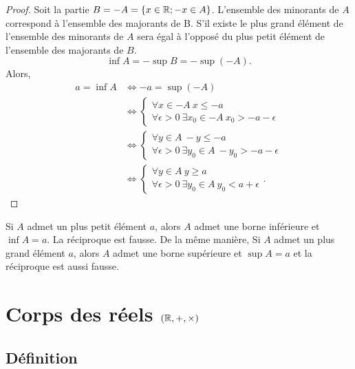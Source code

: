 \begin{proof}
  Soit la partie \(B = -A = \{x\in\mathbb{R}; -x\in A\}\). L'ensemble des minorants de 
  \(A\) correspond à l'ensemble des majorants de B. S'il existe le plus grand 
  élément de l'ensemble des minorants de \(A\) sera égal à l'opposé du plus 
  petit élément de l'ensemble des majorants de \(B\).
  \begin{equation}
    \inf A = -\sup B = -\sup( - A).
  \end{equation}
  Alors,
  \begin{align}
    a = \inf A &\iff -a = \sup( - A)\\
               &\iff \begin{cases} \forall x \in -A \ x\leqslant -a \\ \forall 
               \epsilon>0 \ \exists x_0 \in -A \ x_0> - a - \epsilon 
             \end{cases}\\
               &\iff \begin{cases} \forall y \in A \ -y\leqslant -a \\ \forall 
               \epsilon>0 \ \exists y_0 \in A \ -y_0> - a - \epsilon 
             \end{cases}\\
               &\iff \begin{cases} \forall y \in A \ y\geqslant a \\ \forall 
               \epsilon>0 \ \exists y_0 \in A \ y_0<a + \epsilon \end{cases}.
  \end{align}
\end{proof}

Si \(A\) admet un plus petit élément \(a\), alors \(A\) admet une borne 
inférieure et \(\inf A = a\). La réciproque est fausse. De la même manière, Si 
\(A\) admet un plus grand élément \(a\), alors \(A\) admet une borne supérieure 
et \(\sup A = a\) et la réciproque est aussi fausse.

\section{Corps des réels \((\mathbb{R}, +, \times)\)}

\subsection{Définition}

